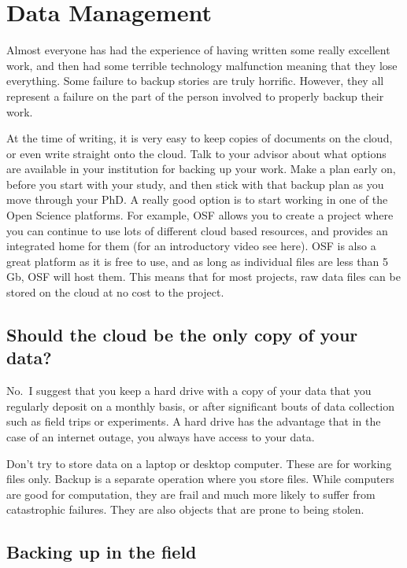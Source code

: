 \documentclass[
]{krantz}
\begin{document}
\hypertarget{data}{%
\section{Data Management}\label{data}}

Almost everyone has had the experience of having written some really excellent work, and then had some terrible technology malfunction meaning that they lose everything. Some failure to backup stories are truly horrific. However, they all represent a failure on the part of the person involved to properly backup their work.

At the time of writing, it is very easy to keep copies of documents on the cloud, or even write straight onto the cloud. Talk to your advisor about what options are available in your institution for backing up your work. Make a plan early on, before you start with your study, and then stick with that backup plan as you move through your PhD. A really good option is to start working in one of the Open Science platforms. For example, OSF allows you to create a project where you can continue to use lots of different cloud based resources, and provides an integrated home for them (for an introductory video see here). OSF is also a great platform as it is free to use, and as long as individual files are less than 5 Gb, OSF will host them. This means that for most projects, raw data files can be stored on the cloud at no cost to the project.

\hypertarget{should-the-cloud-be-the-only-copy-of-your-data}{%
\subsection{Should the cloud be the only copy of your data?}\label{should-the-cloud-be-the-only-copy-of-your-data}}

No.~I suggest that you keep a hard drive with a copy of your data that you regularly deposit on a monthly basis, or after significant bouts of data collection such as field trips or experiments. A hard drive has the advantage that in the case of an internet outage, you always have access to your data.

Don't try to store data on a laptop or desktop computer. These are for working files only. Backup is a separate operation where you store files. While computers are good for computation, they are frail and much more likely to suffer from catastrophic failures. They are also objects that are prone to being stolen.

\hypertarget{backing-up-in-the-field}{%
\subsection{Backing up in the field}\label{backing-up-in-the-field}}
\end{document}
